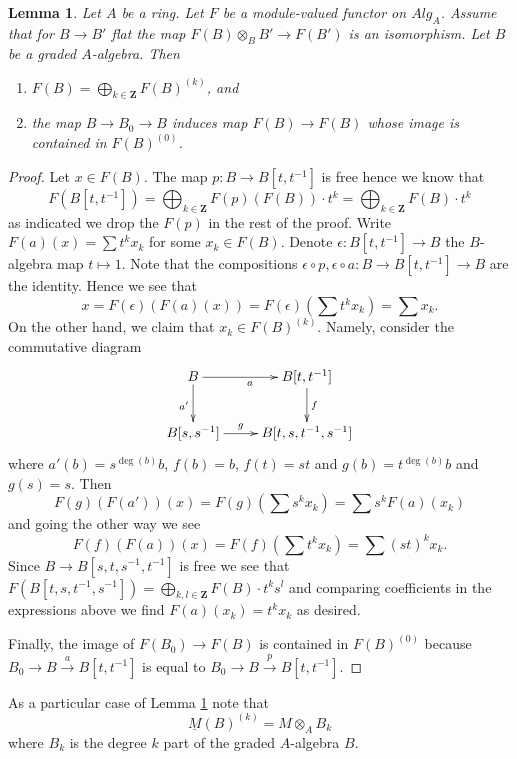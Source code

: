 \documentclass{stacks-project}
\theoremstyle{plain}
\newtheorem{lemma}[subsection]{Lemma}
\theoremstyle{definition}
\theoremstyle{remark}
\numberwithin{equation}{subsection}
\begin{document}
\begin{lemma}
\label{lemma-flat-functor-split}
Let $A$ be a ring.
Let $F$ be a module-valued functor on $\textit{Alg}_A$.
Assume that for $B \to B'$ flat the map
$F(B) \otimes_B B' \to F(B')$ is an isomorphism.
Let $B$ be a graded $A$-algebra. Then
\begin{enumerate}
\item $F(B) = \bigoplus_{k \in \mathbf{Z}} F(B)^{(k)}$, and
\item the map $B \to B_0 \to B$ induces map $F(B) \to F(B)$
whose image is contained in $F(B)^{(0)}$.
\end{enumerate}
\end{lemma}

\begin{proof}
Let $x \in F(B)$. The map $p : B \to B[t, t^{-1}]$ is free
hence we know that
$$
F(B[t, t^{-1}]) =
\bigoplus\nolimits_{k \in \mathbf{Z}} F(p)(F(B)) \cdot t^k =
\bigoplus\nolimits_{k \in \mathbf{Z}} F(B) \cdot t^k
$$
as indicated we drop the $F(p)$ in the rest of the proof.
Write $F(a)(x) = \sum t^k x_k$ for some $x_k \in F(B)$.
Denote $\epsilon : B[t, t^{-1}] \to B$
the $B$-algebra map $t \mapsto 1$. Note that the compositions
$\epsilon \circ p, \epsilon \circ a : B \to B[t, t^{-1}] \to B$ are
the identity. Hence we see that
$$
x = F(\epsilon)(F(a)(x)) = F(\epsilon)(\sum t^k x_k) = \sum x_k.
$$
On the other hand, we claim that $x_k \in F(B)^{(k)}$. Namely, consider
the commutative diagram
$$
\xymatrix{
B \ar[r]_a \ar[d]_{a'} &
B[t, t^{-1}] \ar[d]^f \\
B[s, s^{-1}] \ar[r]^-g &
B[t, s, t^{-1}, s^{-1}]
}
$$
where $a'(b) = s^{\deg(b)}b$, $f(b) = b$, $f(t) = st$ and
$g(b) = t^{\deg(b)}b$ and $g(s) = s$. Then
$$
F(g)(F(a'))(x) = F(g)(\sum s^k x_k) =
\sum s^k F(a)(x_k)
$$
and going the other way we see
$$
F(f)(F(a))(x) = F(f)(\sum t^k x_k) = \sum (st)^k x_k.
$$
Since $B \to B[s, t, s^{-1}, t^{-1}]$ is free we see that
$F(B[t, s, t^{-1}, s^{-1}]) =
\bigoplus_{k, l \in \mathbf{Z}} F(B) \cdot t^ks^l$ and
comparing coefficients in the expressions above we find
$F(a)(x_k) = t^k x_k$ as desired.

\medskip\noindent
Finally, the image of $F(B_0) \to F(B)$ is contained in $F(B)^{(0)}$
because $B_0 \to B \xrightarrow{a} B[t, t^{-1}]$ is equal to
$B_0 \to B \xrightarrow{p} B[t, t^{-1}]$.
\end{proof}

\noindent
As a particular case of
Lemma \ref{lemma-flat-functor-split}
note that
$$
\underline{M}(B)^{(k)} = M \otimes_A B_k
$$
where $B_k$ is the degree $k$ part of the graded $A$-algebra $B$.
\end{document}
